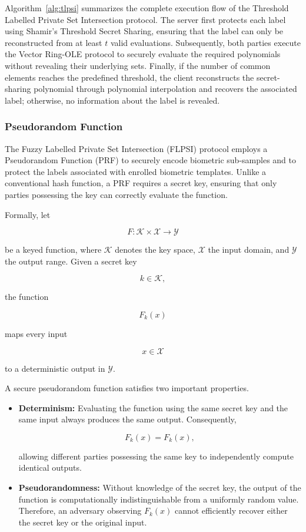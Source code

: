 \documentclass[11pt,a4paper]{article}
\begin{document}
Algorithm~\ref{alg:tlpsi} summarizes the complete execution flow of the
Threshold Labelled Private Set Intersection protocol. The server first
protects each label using Shamir's Threshold Secret Sharing, ensuring
that the label can only be reconstructed from at least $t$ valid
evaluations. Subsequently, both parties execute the Vector Ring-OLE
protocol to securely evaluate the required polynomials without revealing
their underlying sets. Finally, if the number of common elements reaches
the predefined threshold, the client reconstructs the secret-sharing
polynomial through polynomial interpolation and recovers the associated
label; otherwise, no information about the label is revealed.

\subsubsection{Pseudorandom Function}

The Fuzzy Labelled Private Set Intersection (FLPSI) protocol employs a
Pseudorandom Function (PRF) to securely encode biometric sub-samples and
to protect the labels associated with enrolled biometric templates.
Unlike a conventional hash function, a PRF requires a secret key, ensuring
that only parties possessing the key can correctly evaluate the function.

Formally, let

\[
F:\mathcal{K}\times\mathcal{X}\rightarrow\mathcal{Y}
\]

be a keyed function, where $\mathcal{K}$ denotes the key space,
$\mathcal{X}$ the input domain, and $\mathcal{Y}$ the output range.
Given a secret key

\[
k\in\mathcal{K},
\]

the function

\[
F_k(x)
\]

maps every input

\[
x\in\mathcal{X}
\]

to a deterministic output in $\mathcal{Y}$.

A secure pseudorandom function satisfies two important properties.

\begin{itemize}
    \item \textbf{Determinism:} Evaluating the function using the same
    secret key and the same input always produces the same output.
    Consequently,

    \[
    F_k(x)=F_k(x),
    \]

    allowing different parties possessing the same key to independently
    compute identical outputs.

    \item \textbf{Pseudorandomness:} Without knowledge of the secret key,
    the output of the function is computationally indistinguishable from
    a uniformly random value. Therefore, an adversary observing
    $F_k(x)$ cannot efficiently recover either the secret key or the
    original input.
\end{itemize}
\end{document}
